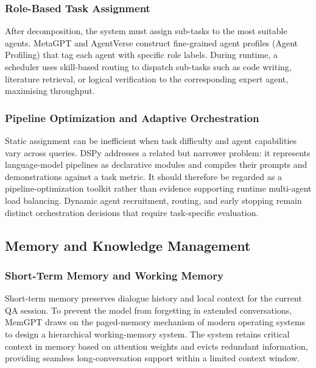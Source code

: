 \subsubsection{Role-Based Task Assignment}
\label{sec:role_assign}

After decomposition, the system must assign sub-tasks to the most suitable
agents.
MetaGPT \citep{hong2024metagpt} and AgentVerse \citep{chen2024agentverse}
construct fine-grained agent profiles (Agent Profiling) that tag each agent
with specific role labels.
During runtime, a scheduler uses skill-based routing to dispatch sub-tasks
such as code writing, literature retrieval, or logical verification to the
corresponding expert agent, maximising throughput.

\subsubsection{Pipeline Optimization and Adaptive Orchestration}
\label{sec:load_balance}

Static assignment can be inefficient when task difficulty and agent capabilities vary across queries. DSPy \citep{khattab2024dspy} addresses a related but narrower problem: it represents language-model pipelines as declarative modules and compiles their prompts and demonstrations against a task metric. It should therefore be regarded as a pipeline-optimization toolkit rather than evidence supporting runtime multi-agent load balancing. Dynamic agent recruitment, routing, and early stopping remain distinct orchestration decisions that require task-specific evaluation.

\subsection{Memory and Knowledge Management}
\label{sec:memory}

\subsubsection{Short-Term Memory and Working Memory}
\label{sec:short_mem}

Short-term memory preserves dialogue history and local context for the
current QA session.
To prevent the model from forgetting in extended conversations, MemGPT
\citep{packer2023memgpt} draws on the paged-memory mechanism of modern
operating systems to design a hierarchical working-memory system.
The system retains critical context in memory based on attention weights
and evicts redundant information, providing seamless long-conversation
support within a limited context window.

